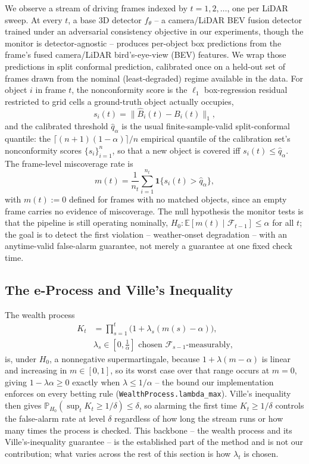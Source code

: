 We observe a stream of driving frames indexed by $t = 1, 2, \ldots$, one per LiDAR sweep. At every $t$, a base 3D detector $f_\theta$ -- a camera/LiDAR BEV fusion detector trained under an adversarial consistency objective in our experiments, though the monitor is detector-agnostic -- produces per-object box predictions from the frame's fused camera/LiDAR bird's-eye-view (BEV) features. We wrap those predictions in split conformal prediction, calibrated once on a held-out set of frames drawn from the nominal (least-degraded) regime available in the data. For object $i$ in frame $t$, the nonconformity score is the $\ell_1$ box-regression residual restricted to grid cells a ground-truth object actually occupies,
\[
s_i(t) = \big\| \hat{B}_i(t) - B_i(t) \big\|_1 ,
\]
and the calibrated threshold $\hat{q}_\alpha$ is the usual finite-sample-valid split-conformal quantile: the $\lceil (n+1)(1-\alpha) \rceil / n$ empirical quantile of the calibration set's nonconformity scores $\{s_i\}_{i=1}^{n}$, so that a new object is covered iff $s_i(t) \le \hat{q}_\alpha$. The frame-level miscoverage rate is
\[
m(t) = \frac{1}{n_t} \sum_{i=1}^{n_t} \mathbf{1}\{s_i(t) > \hat{q}_\alpha\},
\]
with $m(t) := 0$ defined for frames with no matched objects, since an empty frame carries no evidence of miscoverage. The null hypothesis the monitor tests is that the pipeline is still operating nominally, $H_0: \mathbb{E}[m(t) \mid \mathcal{F}_{t-1}] \le \alpha$ for all $t$; the goal is to detect the first violation -- weather-onset degradation -- with an anytime-valid false-alarm guarantee, not merely a guarantee at one fixed check time.

\subsection{The e-Process and Ville's Inequality}
\label{sec:eprocess}

The wealth process
\begin{align*}
K_t &= \prod_{s=1}^{t} \big(1 + \lambda_s (m(s) - \alpha)\big), \\
&\lambda_s \in \left[0, \tfrac{1}{\alpha}\right] \text{ chosen } \mathcal{F}_{s-1}\text{-measurably,}
\end{align*}
is, under $H_0$, a nonnegative supermartingale, because $1 + \lambda(m-\alpha)$ is linear and increasing in $m \in [0,1]$, so its worst case over that range occurs at $m=0$, giving $1 - \lambda\alpha \ge 0$ exactly when $\lambda \le 1/\alpha$ -- the bound our implementation enforces on every betting rule (\texttt{WealthProcess.lambda\_max}). Ville's inequality then gives $\mathbb{P}_{H_0}\!\left(\sup_t K_t \ge 1/\delta\right) \le \delta$, so alarming the first time $K_t \ge 1/\delta$ controls the false-alarm rate at level $\delta$ regardless of how long the stream runs or how many times the process is checked. This backbone -- the wealth process and its Ville's-inequality guarantee -- is the established part of the method and is not our contribution; what varies across the rest of this section is how $\lambda_t$ is chosen.

